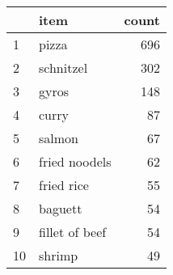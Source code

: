 \begin{tabular}{llr}
\toprule
{} &                                               item &  count \\
\midrule
1    &                                              pizza &    696 \\
2    &                                          schnitzel &    302 \\
3    &                                              gyros &    148 \\
4    &                                              curry &     87 \\
5    &                                             salmon &     67 \\
6    &                                      fried noodels &     62 \\
7    &                                         fried rice &     55 \\
8    &                                            baguett &     54 \\
9    &                                     fillet of beef &     54 \\
10   &                                             shrimp &     49 \\
\bottomrule
\end{tabular}
